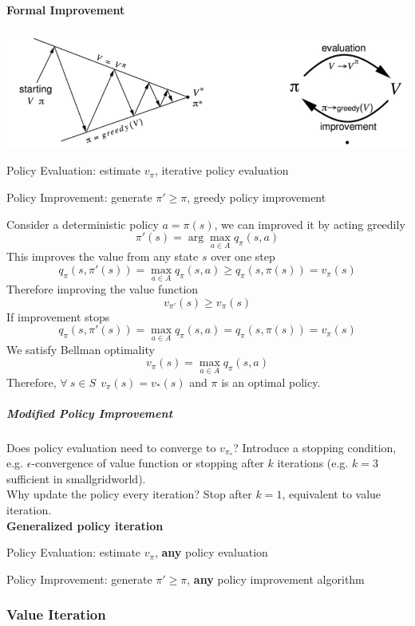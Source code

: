 \documentclass[10pt]{report}
\begin{document}
\paragraph{Formal Improvement}
\begin{center}
	\includegraphics[scale=0.5]{165.png}
\end{center}
\begin{list}{}{}
	\item Policy Evaluation: estimate $v_\pi$, iterative policy evaluation
	\item Policy Improvement: generate $\pi' \geq \pi$, greedy policy improvement
\end{list}
Consider a deterministic policy $a=\pi(s)$, we can improved it by acting greedily $$\pi'(s)=\arg\max_{a\in A} q_\pi(s,a)$$
This improves the value from any state $s$ over one step $$q_\pi(s,\pi'(s)) = \max_{a\in A} q_\pi(s,a)\geq q_\pi(s,\pi(s)) = v_\pi(s)$$
Therefore improving the value function
$$v_{\pi'}(s)\geq v_\pi(s)$$
If improvement stops
$$q_\pi(s,\pi'(s)) = \max_{a\in A}q_\pi(s,a) = q_\pi(s, \pi(s)) = v_\pi(s)$$
We satisfy Bellman optimality
$$v_\pi(s) = \max_{a\in A}q_\pi(s,a)$$
Therefore, $\forall\:s\in S\:\:v_\pi(s) = v_*(s)$ and $\pi$ is an optimal policy.
\subparagraph{Modified Policy Improvement} Does policy evaluation need to converge to $v_{\pi_*}$? Introduce a stopping condition, e.g. $\epsilon$-convergence of value function or stopping after $k$ iterations (e.g. $k=3$ sufficient in smallgridworld).\\
Why update the policy every iteration? Stop after $k=1$, equivalent to value iteration.\\
\textbf{Generalized policy iteration}\begin{list}{}{}
	\item Policy Evaluation: estimate $v_\pi$, \textbf{any} policy evaluation
	\item Policy Improvement: generate $\pi' \geq \pi$, \textbf{any} policy improvement algorithm
\end{list}
\subsubsection{Value Iteration}
\end{document}
